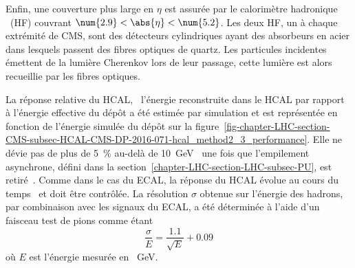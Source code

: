 \par Enfin, une couverture plus large en $\eta$ est assurée par le calorimètre hadronique \CMSforward\ (HF) couvrant $\num{2.9}<\abs{\eta}<\num{5.2}$.
Les deux HF, un à chaque extrémité de CMS, sont des détecteurs cylindriques ayant des absorbeurs en acier dans lesquels passent des fibres optiques de quartz.
Les particules incidentes émettent de la lumière Cherenkov lors de leur passage, cette lumière est alors recueillie par les fibres optiques.
\par La réponse relative du HCAL, \ie\ l'énergie reconstruite dans le HCAL par rapport à l'énergie effective du dépôt a été estimée par simulation et est représentée en fonction de l'énergie simulée du dépôt sur la figure~\ref{fig-chapter-LHC-section-CMS-subsec-HCAL-CMS-DP-2016-071-hcal_method2_3_performance}.
Elle ne dévie pas de plus de \SI{5}{\%} au-delà de \SI{10}{\GeV}~\cite{CMS-DP-2016-071} une fois que l'empilement asynchrone, défini dans la section~\ref{chapter-LHC-section-LHC-subsec-PU}, est retiré~\cite{CMS-DP-2016-071,CMS-DP-2018-018}.
Comme dans le cas du ECAL, la réponse du HCAL évolue au cours du temps~\cite{CMS-DP-2017-033} et doit être contrôlée.
La résolution $\sigma$ obtenue sur l'énergie des hadrons, par combinaison avec les signaux du ECAL, a été déterminée à l'aide d'un faisceau test de pions comme étant
\begin{equation}
\frac{\sigma}{E} = \frac{\num{1.1}}{\sqrt{E}} + \num{0.09}
\end{equation}
où $E$ est l'énergie mesurée en \SI{}{\GeV}.